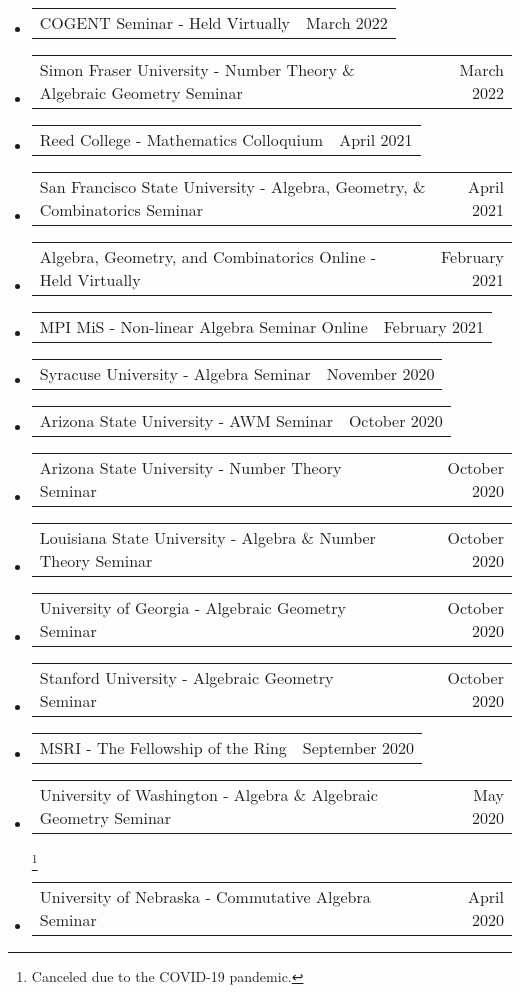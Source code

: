 \documentclass[letterpaper,11pt]{article}
\makeatletter
\newcommand{\ressubheadingTalk}[2]{
\begin{tabular*}{6.5in}[t]{l@{\cftdotfill{\cftsecdotsep}\extracolsep{\fill}}r}
		#1 & #2 \\
\end{tabular*}\vspace{-6pt}}
\makeatother
\begin{document}
\begin{itemize}
\item
	\ressubheadingTalk{COGENT Seminar - Held Virtually}{March 2022}
	
\item
	\ressubheadingTalk{Simon Fraser University - Number Theory \& Algebraic Geometry Seminar}{March 2022}
	
\item
	\ressubheadingTalk{Reed College - Mathematics Colloquium}{April 2021}
	
\item
	\ressubheadingTalk{San Francisco State University - Algebra, Geometry, \& Combinatorics Seminar}{April 2021}
	
\item
	\ressubheadingTalk{Algebra, Geometry, and Combinatorics Online - Held Virtually}{February 2021}
	
\item
	\ressubheadingTalk{MPI MiS - Non-linear Algebra Seminar Online}{February 2021}
	
\item
	\ressubheadingTalk{Syracuse University - Algebra Seminar}{November 2020}
	
\item
	\ressubheadingTalk{Arizona State University - AWM Seminar}{October 2020}

\item
	\ressubheadingTalk{Arizona State University - Number Theory Seminar}{October 2020}

\item
	\ressubheadingTalk{Louisiana State University - Algebra \& Number Theory Seminar}{October 2020}
		
\item
	\ressubheadingTalk{University of Georgia - Algebraic Geometry Seminar}{October 2020}
	
\item
	\ressubheadingTalk{Stanford University - Algebraic Geometry Seminar}{October 2020}
	
\item
	\ressubheadingTalk{MSRI - The Fellowship of the Ring}{September 2020}
	
\item 
	\ressubheadingTalk{University of Washington - Algebra \& Algebraic Geometry Seminar}{May 2020}\footnote[2]{Canceled due to the COVID-19 pandemic.} 


\item 
	\ressubheadingTalk{University of Nebraska - Commutative Algebra Seminar}{April 2020}\footnotemark[2]


\end{itemize}
\end{document}
